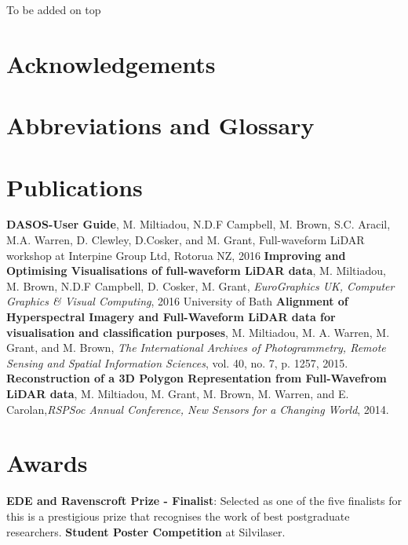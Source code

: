 \documentclass[11pt,nofootinbib]{report}
\begin{document}
\newpage
\thispagestyle{empty}
	\setcounter{secnumdepth}{0}
	To be added on top
%		
	\section{Acknowledgements}\label{Acknowledgments}
		
		\thispagestyle{empty}
		\newpage
	

	\section {Abbreviations and Glossary}\label{Abbreviations}
	
	\newpage
	\section{Publications}
		\textbf{DASOS-User Guide}, M. Miltiadou, N.D.F Campbell, M. Brown, S.C. Aracil, M.A. Warren, D. Clewley, D.Cosker, and M. Grant, Full-waveform LiDAR workshop at Interpine Group Ltd, Rotorua NZ, 2016\newline
		\textbf{Improving and Optimising Visualisations of full-waveform LiDAR data}, M. Miltiadou, M. Brown, N.D.F Campbell,  D. Cosker, M. Grant, \textit{EuroGraphics UK, Computer Graphics \& Visual Computing}, 2016 \newline
		University of Bath
		\textbf{Alignment of Hyperspectral Imagery and Full-Waveform LiDAR data for visualisation and classification purposes}, M. Miltiadou, M. A. Warren, M. Grant, and M. Brown, \textit{The International Archives of Photogrammetry, Remote Sensing and Spatial Information Sciences}, vol. 40, no. 7, p. 1257, 2015.\newline
		\textbf{Reconstruction of a 3D Polygon Representation from Full-Wavefrom LiDAR data}, M. Miltiadou, M. Grant, M. Brown, M. Warren, and E. Carolan,\textit{RSPSoc Annual Conference, New Sensors for a Changing World}, 2014.\newline
	 
	
	\section{Awards}
		\textbf{EDE and Ravenscroft Prize - Finalist}: Selected as one of the five finalists for this is a prestigious prize that recognises the work of best postgraduate researchers.\newline
		\textbf{Student Poster Competition} at Silvilaser.
		
\end{document}
